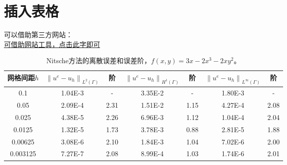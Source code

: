 \newpage
\section{插入表格}

可以借助第三方网站：\\
\href{http://www.tablesgenerator.com/latex_tables}{可借助网站工具，点击此字即可}

\begin{table}[!htbp]
	\caption{Nitsche方法的离散误差和误差阶，$f(x,y)=3x-2x^3-2xy^2$。}%
	\label{tab:quxianwuchabiaoge_Nitsche}
	\centering
	\footnotesize%
	\setlength{\tabcolsep}{4pt}%
	\renewcommand{\arraystretch}{1.2}%
	\begin{tabular}{|c|c|c|c|c|c|c|}
		\hline
		网格间距$h$  & $\left \| u^e-u_h \right \|_{L^2(\Gamma)}$ & 阶 & $\left \| u^e-u_h \right \|_{H^1(\Gamma)}$ & 阶 & $\left \| u^e-u_h \right \|_{L^{\infty}(\Gamma)}$ & 阶 \\ \hline
		0.1      & 1.04E-3                                      &    -   & 3.35E-2                                      &    -   & 1.80E-3                                             &   -    \\ \hline
		0.05     & 2.09E-4                                      & 2.31  & 1.51E-2                                      & 1.15  & 4.27E-4                                             & 2.08  \\ \hline
		0.025    & 4.38E-5                                      & 2.26  & 6.96E-3                                      & 1.12  & 1.04E-4                                             & 2.04  \\ \hline
		0.0125   & 1.32E-5                                      & 1.73  & 3.78E-3                                      & 0.88  & 2.81E-5                                             & 1.88  \\ \hline
		0.00625  & 3.08E-6                                      & 2.10  & 1.84E-3                                      & 1.04  & 7.02E-6                                             & 2.00  \\ \hline
		0.003125 & 7.27E-7                                      & 2.08  & 8.99E-4                                      & 1.03  & 1.74E-6                                             & 2.01  \\ \hline
	\end{tabular}
\end{table}

